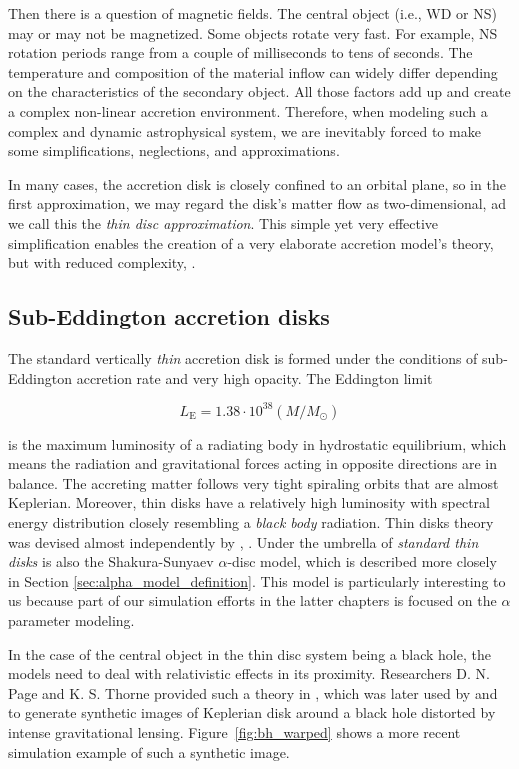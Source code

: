     Then there is a question of magnetic fields. The central object (i.e., WD or NS) may or may not be magnetized. Some objects rotate very fast. For example, NS rotation periods range from a couple of milliseconds to tens of seconds. The temperature and composition of the material inflow can widely differ depending on the characteristics of the secondary object. All those factors add up and create a complex non-linear accretion environment. Therefore, when modeling such a complex and dynamic astrophysical system, we are inevitably forced to make some simplifications, neglections, and approximations. 

    In many cases, the accretion disk is closely confined to an orbital plane, so in the first approximation, we may regard the disk's matter flow as two-dimensional, ad we call this the \emph{thin disc approximation}. This simple yet very effective simplification enables the creation of a very elaborate accretion model's theory, but with reduced complexity, \citep{acpow}.

\subsection{Sub-Eddington accretion disks}
    The standard vertically \emph{thin} accretion disk is formed under the conditions of sub-Eddington accretion rate and very high opacity. The Eddington limit
    
    \begin{equation}
        L_{\mathrm{E}} = 1.38 \cdot 10^{38} (M / M_{\odot}) 
    \end{equation}

    is the maximum luminosity of a radiating body in hydrostatic equilibrium, which means the radiation and gravitational forces acting in opposite directions are in balance. The accreting matter follows very tight spiraling orbits that are almost Keplerian. Moreover, thin disks have a relatively high luminosity with spectral energy distribution closely resembling a \emph{black body} radiation. Thin disks theory was devised almost independently by \citep{lyndenbell1974}, \citep{pringle1981}. Under the umbrella of \emph{standard thin disks} is also the Shakura-Sunyaev $\alpha$-disc model, which is described more closely in Section \ref{sec:alpha_model_definition}. This model is particularly interesting to us because part of our simulation efforts in the latter chapters is focused on the $\alpha$ parameter modeling.

    In the case of the central object in the thin disc system being a black hole, the models need to deal with relativistic effects in its proximity. Researchers D. N. Page and K. S. Thorne provided such a theory in \citep{page1974}, which was later used by \citep{luminet1979} and \citep{marck1996} to generate synthetic images of Keplerian disk around a black hole distorted by intense gravitational lensing. Figure~\ref{fig:bh_warped} shows a more recent simulation example of such a synthetic image. 

